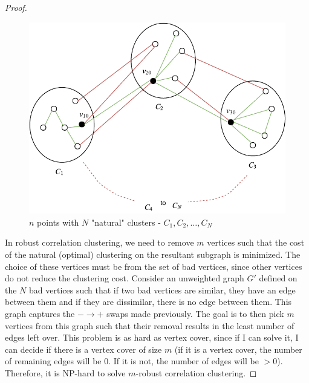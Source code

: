 \begin{proof}
\begin{figure}[ht]
\centering
\includegraphics{./img/multipartite.pdf}
\caption{$n$ points with $N$ "natural" clusters - $C_1, C_2, \dots, C_N$}
\label{fig:2}
\end{figure}

In robust correlation clustering, we need to remove $m$ vertices such that the cost of the natural (optimal) clustering on the resultant subgraph is minimized. The choice of these vertices must be from the set of bad vertices, since other vertices do not reduce the clustering cost. Consider an unweighted graph $G'$ defined on the $N$ bad vertices such that if two bad vertices are similar, they have an edge between them and if they are dissimilar, there is no edge between them. This graph captures the $- \to +$ swaps made previously. The goal is to then pick $m$ vertices from this graph such that their removal results in the least number of edges left over. This problem is as hard as vertex cover, since if I can solve it, I can decide if there is a vertex cover of size $m$ (if it is a vertex cover, the number of remaining edges will be $0$. If it is not, the number of edges will be $> 0$). Therefore, it is NP-hard to solve $m$-robust correlation clustering.

\end{proof}